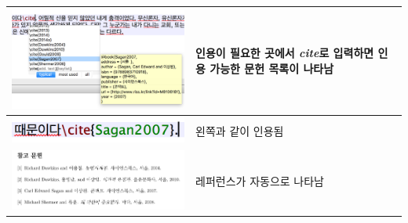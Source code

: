 \documentclass[11pt]{article}
\begin{document}
\begin{tabular}{ m{11cm} m{50mm} }
	\hline
	\includegraphics[width=10cm]{./image/latex_bibliography4.png} & 인용이 필요한 곳에서 \textit{cite}로 입력하면 인용 가능한 문헌 목록이 나타남 \\
	\hline
	\includegraphics[width=10cm]{./image/latex_bibliography7.png} & 왼쪽과 같이 인용됨\\
	\hline
	\includegraphics[width=10cm]{./image/latex_bibliography8.png} & 레퍼런스가 자동으로 나타남\\
\end{tabular}
\end{document}
